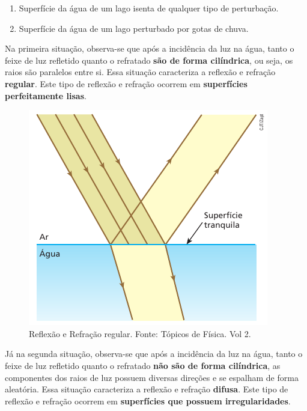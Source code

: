 \documentclass[11pt,twocolumn,oneside]{article}
\begin{document}
\begin{enumerate}

\item{Superfície da água de um lago isenta de qualquer tipo de perturbação.}

\item{Superfície da água de um lago perturbado por gotas de chuva.}

\end{enumerate}


Na primeira situação, observa-se que após a incidência da luz na água, tanto o feixe de luz refletido quanto o refratado \textbf{são de forma cilíndrica}, ou seja, os raios são paralelos entre si. Essa situação caracteriza a reflexão e refração \textbf{regular}. Este tipo de reflexão e refração ocorrem em \textbf{superfícies perfeitamente lisas}.


\begin{figure}[h]{}
\centering\includegraphics[width=2.5truein]{img8.png}
\caption{Reflexão e Refração regular. Fonte: Tópicos de Física. Vol 2.}
\centering
\end{figure}

Já na segunda situação, observa-se que após a incidência da luz na água, tanto o feixe de luz refletido quanto o refratado \textbf{não são de forma cilíndrica}, as componentes dos raios de luz possuem diversas direções e se espalham de forma aleatória. Essa situação caracteriza a reflexão e refração \textbf{difusa}. Este tipo de reflexão e refração ocorrem em \textbf{superfícies que possuem irregularidades}.
\end{document}
